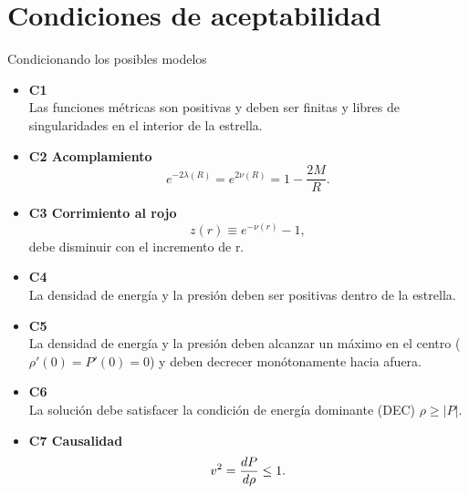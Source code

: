 \documentclass[11pt]{beamer}
\begin{document}
\section{Condiciones de aceptabilidad}
\begin{frame}{Condicionando los posibles modelos}
    \begin{itemize}
        \item \textbf{C1} \\
            Las funciones métricas son positivas y deben ser finitas y libres de singularidades en el
            interior de la estrella.
        \item \textbf{C2 Acomplamiento}  \\
            \begin{equation}
                e ^ { -2 \lambda(R) } =  e ^ {  2 \nu(R) } =  1 - \frac { 2 M } { R }.
            \end{equation}
        \item \textbf{C3 Corrimiento al rojo} \\
            \begin{equation}
                z(r)\equiv e^{-\nu(r)}-1,
            \end{equation}
            debe disminuir con el incremento de r.
    \end{itemize}
\end{frame}

\begin{frame}{}
    \begin{itemize}
        \item \textbf{C4} \\
        La densidad de energía y la presión deben ser positivas dentro de la estrella.
        \item \textbf{C5} \\
        La densidad de energía y la presión deben alcanzar un máximo en el centro ($\rho'(0)=P'(0)=0$) y deben decrecer monótonamente hacia afuera.
        \item \textbf{C6} \\
        La solución debe satisfacer la condición de energía dominante (DEC) $\rho \geq |P|$.
        \item \textbf{C7 Causalidad} \\ 
        \begin{equation}
            v^2=\dv{P}{\rho}\leq 1.
        \end{equation}
    \end{itemize}
\end{frame}
\end{document}
